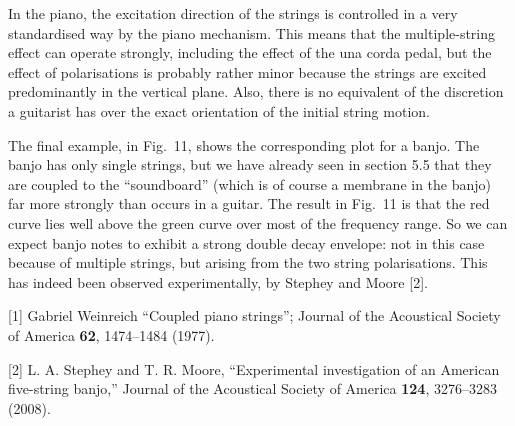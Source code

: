 
  In the piano, the excitation direction of the strings is controlled in a very 
  standardised way by the piano mechanism. This means that the multiple-string 
  effect can operate strongly, including the effect of the una corda pedal, but 
  the effect of polarisations is probably rather minor because the strings are 
  excited predominantly in the vertical plane. Also, there is no equivalent of 
  the discretion a guitarist has over the exact orientation of the initial 
  string motion. 

  The final example, in Fig.\ 11, shows the corresponding plot for a banjo. The 
  banjo has only single strings, but we have already seen in section 5.5 that 
  they are coupled to the ``soundboard'' (which is of course a membrane in the 
  banjo) far more strongly than occurs in a guitar. The result in Fig.\ 11 is 
  that the red curve lies well above the green curve over most of the frequency 
  range. So we can expect banjo notes to exhibit a strong double decay 
  envelope: not in this case because of multiple strings, but arising from the 
  two string polarisations. This has indeed been observed experimentally, by 
  Stephey and Moore [2]. 




  \sectionreferences{}[1] Gabriel Weinreich ``Coupled piano strings''; Journal 
  of the Acoustical Society of America \textbf{62}, 1474--1484 (1977). 

  [2] L. A. Stephey and T. R. Moore, “Experimental investigation of an American 
  five-string banjo,” Journal of the Acoustical Society of America 
  \textbf{124}, 3276--3283 (2008). 